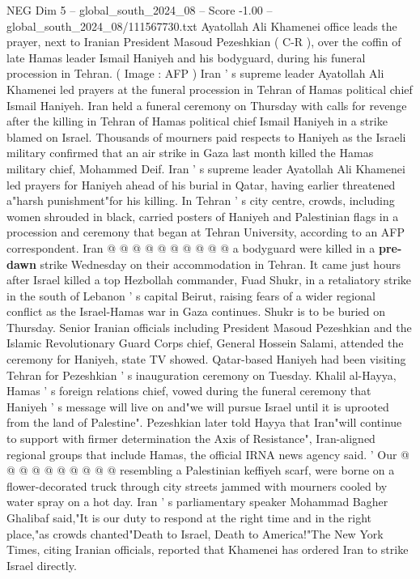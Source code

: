 \begin{textsample}{NEG Dim 5 – global\_south\_2024\_08 – Score -1.00 – global\_south\_2024\_08/111567730.txt}  \label{ex:f5_neg_124}
Ayatollah Ali Khamenei office leads the prayer, next to Iranian President Masoud Pezeshkian ( C-R ), over the coffin of late Hamas leader Ismail Haniyeh and his bodyguard, during his funeral procession in Tehran. ( Image : AFP ) Iran ' s supreme leader Ayatollah Ali Khamenei led prayers at the funeral procession in Tehran of Hamas political chief Ismail Haniyeh.
Iran held a funeral ceremony on Thursday with calls for revenge after the killing in Tehran of Hamas political chief Ismail Haniyeh in a strike blamed on Israel.
Thousands of mourners paid respects to Haniyeh as the Israeli military confirmed that an air strike in Gaza last month killed the Hamas military chief, Mohammed Deif.
Iran ' s supreme leader Ayatollah Ali Khamenei led prayers for Haniyeh ahead of his burial in Qatar, having earlier threatened a"harsh punishment"for his killing.
In Tehran ' s city centre, crowds, including women shrouded in black, carried posters of Haniyeh and Palestinian flags in a procession and ceremony that began at Tehran University, according to an AFP correspondent.
Iran @ @ @ @ @ @ @ @ @ @ a bodyguard were killed in a \textbf{pre-dawn} strike Wednesday on their accommodation in Tehran.
It came just hours after Israel killed a top Hezbollah commander, Fuad Shukr, in a retaliatory strike in the south of Lebanon ' s capital Beirut, raising fears of a wider regional conflict as the Israel-Hamas war in Gaza continues.
Shukr is to be buried on Thursday.
Senior Iranian officials including President Masoud Pezeshkian and the Islamic Revolutionary Guard Corps chief, General Hossein Salami, attended the ceremony for Haniyeh, state TV showed.
Qatar-based Haniyeh had been visiting Tehran for Pezeshkian ' s inauguration ceremony on Tuesday.
Khalil al-Hayya, Hamas ' s foreign relations chief, vowed during the funeral ceremony that Haniyeh ' s message will live on and"we will pursue Israel until it is uprooted from the land of Palestine".
Pezeshkian later told Hayya that Iran"will continue to support with firmer determination the Axis of Resistance", Iran-aligned regional groups that include Hamas, the official IRNA news agency said. ' Our @ @ @ @ @ @ @ @ @ @ resembling a Palestinian keffiyeh scarf, were borne on a flower-decorated truck through city streets jammed with mourners cooled by water spray on a hot day.
Iran ' s parliamentary speaker Mohammad Bagher Ghalibaf said,"It is our duty to respond at the right time and in the right place,"as crowds chanted"Death to Israel, Death to America!"The New York Times, citing Iranian officials, reported that Khamenei has ordered Iran to strike Israel directly.

\end{textsample}
